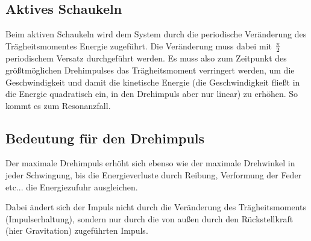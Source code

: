\subsection{Aktives Schaukeln}

Beim aktiven Schaukeln wird dem System durch die periodische Veränderung des Trägheitsmomentes Energie zugeführt.
Die Veränderung muss dabei mit $\pi \over 2$ periodischem Versatz durchgeführt werden.
Es muss also zum Zeitpunkt des größtmöglichen Drehimpulses das Trägheitsmoment verringert werden, um die Geschwindigkeit und damit die kinetische Energie (die Geschwindigkeit fließt in die Energie quadratisch ein, in den Drehimpuls aber nur linear) zu erhöhen.
So kommt es zum Resonanzfall.

\subsection{Bedeutung für den Drehimpuls}

Der maximale Drehimpuls erhöht sich ebenso wie der maximale Drehwinkel in jeder Schwingung, bis die Energieverluste durch Reibung, Verformung der Feder etc... die Energiezufuhr ausgleichen.

Dabei ändert sich der Impuls nicht durch die Veränderung des Trägheitsmoments (Impulserhaltung), sondern nur durch die von außen durch den Rückstellkraft (hier Gravitation) zugeführten Impuls.
